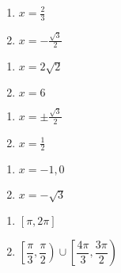 \begin{multicols}{2}
\begin{enumerate}
\setcounter{enumi}{\value{HW}}

\item $x = \frac{2}{3}$ 
\item $x=-\frac{\sqrt{3}}{2}$

\setcounter{HW}{\value{enumi}}
\end{enumerate}
\end{multicols}


\begin{multicols}{2}
\begin{enumerate}
\setcounter{enumi}{\value{HW}}

\item  $x = 2\sqrt{2}$
\item  $x = 6$

\setcounter{HW}{\value{enumi}}
\end{enumerate}
\end{multicols}

\begin{multicols}{2}
\begin{enumerate}
\setcounter{enumi}{\value{HW}}

\item $x = \pm \frac{\sqrt{3}}{2}$
\item $x = \frac{1}{2}$ 

\setcounter{HW}{\value{enumi}}
\end{enumerate}
\end{multicols}

\begin{multicols}{2}
\begin{enumerate}
\setcounter{enumi}{\value{HW}}

\item $x = -1,0$
\item $x = -\sqrt{3}$

\setcounter{HW}{\value{enumi}}
\end{enumerate}
\end{multicols}

\begin{multicols}{2}

\begin{enumerate}

\setcounter{enumi}{\value{HW}}

\item $\left[ \pi, 2\pi \right]$ 
\item $\left[ \dfrac{\pi}{3}, \dfrac{\pi}{2} \right) \cup \left[ \dfrac{4\pi}{3}, \dfrac{3\pi}{2} \right)$

\setcounter{HW}{\value{enumi}}

\end{enumerate}

\end{multicols}

